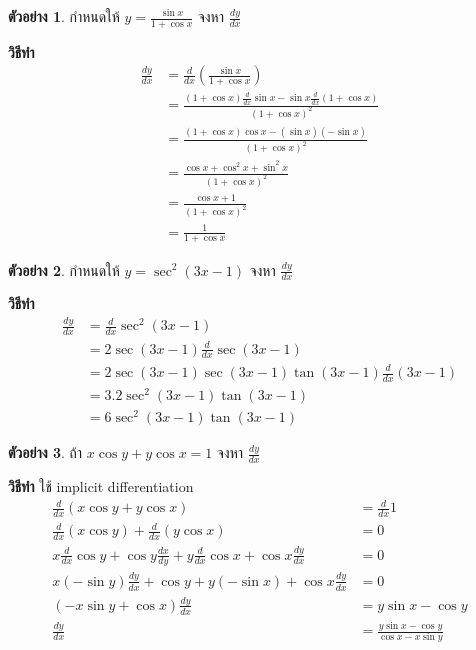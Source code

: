 \documentclass[
]{book}
\theoremstyle{definition}
\theoremstyle{definition}
\newtheorem{example}{ตัวอย่าง}[chapter]
\theoremstyle{definition}
\theoremstyle{definition}
\theoremstyle{remark}
\begin{document}
\begin{example}
กำหนดให้ \(\displaystyle y=\frac{\sin x}{1+\cos x}\) จงหา
\(\displaystyle \frac{dy}{dx}\)
\end{example}

\textbf{วิธีทำ} \begin{equation}   \begin{aligned}
\displaystyle \frac{dy}{dx}&=\frac{d}{dx}(\frac{\sin x}{1+\cos x})\\
&=\frac{(1+\cos x)\displaystyle \frac{d}{dx}\sin x -\sin x\displaystyle
\frac{d}{dx}(1+\cos x)}{(1+\cos x)^{2}}\\
&=\frac{(1+\cos x)\cos x-(\sin x)(-\sin x)}{(1+\cos x)^{2}}\\
&=\frac{\cos x+\cos^{2}x+\sin^{2}x }{(1+\cos x)^{2}}\\
&=\frac{\cos x+1}{(1+\cos x)^{2}}\\
&=\frac{1}{1+\cos x}
  \end{aligned} \end{equation}

\begin{example}
กำหนดให้ \(y=\sec^{2}(3x-1)\) จงหา \(\displaystyle
\frac{dy}{dx}\)
\end{example}

\textbf{วิธีทำ} \begin{equation}   \begin{aligned}
\displaystyle \frac{dy}{dx}&=\frac{d}{dx}\sec^{2}(3x-1)\\
&=2\sec(3x-1)\displaystyle \frac{d}{dx}\sec(3x-1)\\
&=2\sec(3x-1)\sec(3x-1)\tan(3x-1)\displaystyle \frac{d}{dx}(3x-1)\\
&=3.2\sec^{2}(3x-1)\tan(3x-1)\\
&=6\sec^{2}(3x-1)\tan(3x-1)
  \end{aligned} \end{equation}

\begin{example}
ถ้า \(x\cos y+y\cos x=1\) จงหา \(\displaystyle \frac{dy}{dx}\)
\end{example}

\textbf{วิธีทำ} ใช้ implicit differentiation \begin{equation}   \begin{aligned}
\displaystyle \frac{d}{dx}(x\cos y +y\cos x)&=\frac{d}{dx}1\\
\displaystyle \frac{d}{dx}(x\cos y)+\frac{d}{dx}(y\cos x)&=0\\
\displaystyle x\frac{d}{dx}\cos y+\cos y \frac{dx}{dy}+y\frac{d}{dx}\cos
x+\cos x\frac{dy}{dx}&=0\\
\displaystyle x(-\sin y)\frac{dy}{dx}+\cos y + y(-\sin x)+\cos
x\frac{dy}{dx}&=0\\
\displaystyle (-x\sin y+\cos x)\frac{dy}{dx}&=y\sin x -\cos y\\
\displaystyle \frac{dy}{dx}&=\frac{y\sin x-\cos y}{\cos x-x\sin y}
  \end{aligned} \end{equation}
\end{document}
